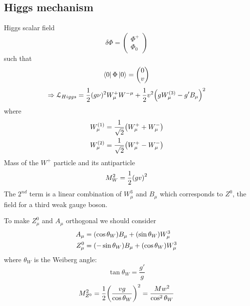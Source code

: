 \documentclass[../main/main.tex]{subfiles}
\begin{document}
\subsection{Higgs mechanism}
Higgs scalar field
\begin{equation}
  \delta \Phi = \begin{pmatrix}
  \Phi ^+ \\
  \Phi _0
  \end{pmatrix}
\end{equation}
such that
\begin{equation}
  \bra{0} \Phi \ket{0} = \begin{pmatrix}
  0 \\
  v
  \end{pmatrix}
\end{equation}
\begin{equation}
  \Rightarrow \mathcal{L}_{Higgs} = \frac{1}{2} (g \nu )^2 W_ \mu ^+ W^{- \mu }
  + \frac{1}{2} v^2 \qty(g W _ \mu ^{(3)} - g' B _ \mu )^2
\end{equation}
where
\begin{subequations}
\begin{align}
  W_ \mu ^{(1)} &=  \frac{1}{\sqrt{2} } \qty(W_ \mu ^+ + W _ \mu ^-) \\
  W_ \mu ^{(2)} &=  \frac{1}{\sqrt{2} } \qty(W_ \mu ^+ - W _ \mu ^-)
\end{align}
\end{subequations}
Mass of the \( W^+ \) particle and its antiparticle
\begin{equation}
  M_W^2 = \frac{1}{2} \qty(g v)^2
\end{equation}
The \( 2^{nd} \) term is a linear combination of \( W_ \mu ^3 \) and \( B_ \mu  \) which corresponds to \( Z^0 \), the field for a third weak gauge boson.

To make \( Z_ \mu ^0 \) and \( A _ \mu  \) orthogonal we should consider
\begin{subequations}
\begin{align}
  A_ \mu  &=  \qty(\cos \theta _W) B _ \mu  + \qty(\sin \theta _W ) W_ \mu ^3 \\
  Z_ \mu ^0 & = \qty(- \sin \theta _W ) B _ \mu + \qty(\cos \theta _W ) W_ \mu ^3
\end{align}
\end{subequations}
where \( \theta _W \) is the Weiberg angle:
\begin{equation}
  \tan \theta _W = \frac{g'}{g}
\end{equation}
\begin{equation}
  M_ {Z^0}^2 = \frac{1}{2} \qty(\frac{vg}{\cos \theta _W})^2 = \frac{M w^2}{\cos^2 \theta _W}
\end{equation}
\end{document}
